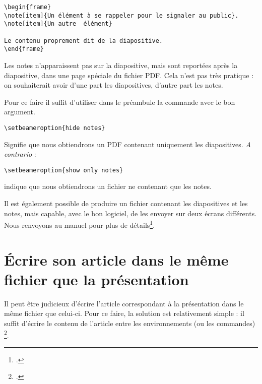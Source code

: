 \begin{verbatim}
\begin{frame}
\note[item]{Un élément à se rappeler pour le signaler au public}.
\note[item]{Un autre  élément}
	
Le contenu proprement dit de la diapositive.
\end{frame}
\end{verbatim}


Les notes n'apparaissent pas sur la diapositive, mais sont reportées après la diapositive, dans une page spéciale du fichier PDF. Cela n'est pas très pratique : on souhaiterait avoir d'une part les diapositives, d'autre part les notes. 

Pour ce faire il suffit d'utiliser dans le préambule la commande  avec le bon argument.

\begin{verbatim}
\setbeameroption{hide notes}
\end{verbatim}

Signifie que nous obtiendrons un PDF contenant uniquement les diapositives. \emph{A contrario} :
\begin{verbatim}
\setbeameroption{show only notes}
\end{verbatim}
indique que nous obtiendrons un fichier ne contenant que les notes.

Il est également possible de produire un fichier contenant les diapositives et les notes, mais capable, avec le bon logiciel, de les envoyer sur deux écrans différents. Nous renvoyons au manuel pour plus de détails\footcite{beamer_2ecrans}.

\section{Écrire son article dans le même fichier que la présentation}

Il peut être judicieux d'écrire l'article correspondant à la présentation dans le même fichier que celui-ci. Pour ce faire, la solution est relativement simple : il suffit d'écrire le contenu de l'article entre les environnements (ou les commandes) \footcites[À noter qu'on peut aussi introduire des miniatures des diapositives  dans l'article, voir :][]{beamer_diapo_article}.

